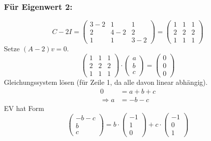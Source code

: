 \documentclass{article} %
\begin{document}
\subsubsection*{Für Eigenwert 2:}
\[
C - 2 I = \begin{pmatrix}
3-2&1&1\\
2&4-2&2\\
1&1&3-2
\end{pmatrix}
 = \begin{pmatrix}
1&1&1\\
2&2&2\\
1&1&1
\end{pmatrix}
\]
Setze $(A - 2)v = 0$.
\[
\begin{pmatrix}
1&1&1\\
2&2&2\\
1&1&1
\end{pmatrix} \cdot \begin{pmatrix}
a \\ b\\c
\end{pmatrix} = \begin{pmatrix}
0\\0\\0
\end{pmatrix}
\]
Gleichungssystem lösen (für Zeile 1, da alle davon linear abhängig). 
\begin{align*}
    0 & = a+b+c \\
    \Rightarrow a & = -b-c 
\end{align*}
EV hat Form 
\[
\begin{pmatrix}
-b-c\\b\\c
\end{pmatrix} = b \cdot \begin{pmatrix}
-1\\1\\0
\end{pmatrix} + c \cdot \begin{pmatrix}
-1\\0\\1
\end{pmatrix}
\]
\end{document}

